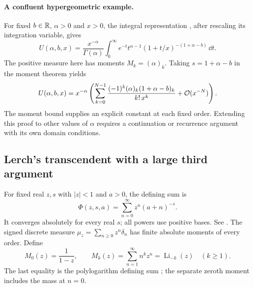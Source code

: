 \paragraph{A confluent hypergeometric example.}
For fixed $b\in\mathbb R$, $\alpha>0$ and $x>0$, the integral representation
\cite[(13.4.4)]{dlmf}, after rescaling its integration variable, gives
\[
 U(\alpha,b,x)=\frac{x^{-\alpha}}{\Gamma(\alpha)}
     \int_0^\infty e^{-t}t^{\alpha-1}
                      (1+t/x)^{-(1+\alpha-b)}\,\dd t.
\]
The positive measure here has moments
$M_k=(\alpha)_k$. Taking $s=1+\alpha-b$ in the moment theorem yields
\begin{equation}
 U(\alpha,b,x)=x^{-\alpha}
   \left(\sum_{k=0}^{N-1}
        \frac{(-1)^k(\alpha)_k(1+\alpha-b)_k}{k!\,x^k}
          +\mathcal O(x^{-N})\right).
 \label{eq:special-function-tricomi-moments}
\end{equation}
The moment bound supplies an explicit constant at each fixed order.
Extending this proof to other values of $\alpha$ requires a
continuation or recurrence argument with its own domain conditions.

\subsection{Lerch's transcendent with a large third argument}

For fixed real $z,s$ with $|z|<1$ and $a>0$, the defining sum is
\begin{equation}
 \Phi(z,s,a)=\sum_{n=0}^\infty z^n(a+n)^{-s}.
 \label{eq:special-function-lerch-definition}
\end{equation}
It converges absolutely for every real $s$; all powers use positive
bases. See \cite[(25.14.1)]{dlmf}. The signed discrete measure
$\mu_z=\sum_{n\ge0}z^n\delta_n$ has finite absolute moments of every
order. Define
\begin{equation}
 M_0(z)=\frac1{1-z},\qquad
 M_k(z)=\sum_{n=1}^\infty n^kz^n
       =\operatorname{Li}_{-k}(z)\quad(k\ge1).
 \label{eq:special-function-lerch-moments}
\end{equation}
The last equality is the polylogarithm defining sum
\cite[(25.12.10)]{dlmf}; the separate zeroth moment includes the
mass at $n=0$.


